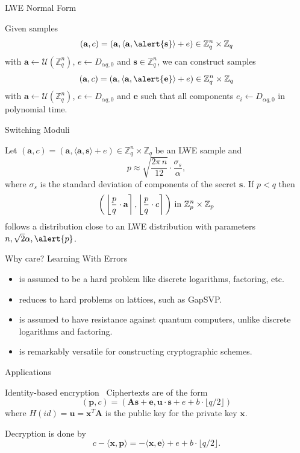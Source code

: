 \documentclass[10pt,compress]{beamer}
\renewcommand{\vec}[1]{\mathbf{#1}\xspace}
\newcommand{\A}{\vec{A}}
\newcommand{\s}{\vec{s}}
\newcommand{\ip}[2]{\langle #1, #2 \rangle}
\newcommand{\pq}{\ensuremath{\frac{p}{q}}}
\renewcommand{\vec}[1]{\mathbf{#1}\xspace}
\newcommand{\Z}{\ensuremath{\mathbb{Z}}\xspace}
\newcommand{\round}[1]{\ensuremath{\left\lfloor{#1}\right\rceil}\xspace}
\begin{document}
\begin{frame}{LWE Normal Form}
  \begin{alertblock}{}
    Given samples \[(\vec{a},c)=(\vec{a},\langle\vec{a},\alert{\vec{s}}\rangle+ e) \in \Z_q^n \times \Z_q\] with $\vec{a} \gets \mathcal{U}(\Z_q^n)$, $e \gets D_{\alpha q,0}$ and $\vec{s} \in \Z_q^n$, we can construct samples \[(\vec{a}, c)=(\vec{a},\langle\vec{a},\alert{\vec{e}}\rangle+ e) \in \Z_q^n \times \Z_q\] 
    with $\vec{a} \gets \mathcal{U}(\Z_q^n)$, $e \gets D_{\alpha q, 0}$ and \alert{$\vec{e}$} such that all components \alert{$e_i \gets D_{\alpha q, 0}$} in polynomial time.
  \end{alertblock}
\end{frame}

\begin{frame}{Switching Moduli}
  \begin{alertblock}{}
    Let $(\vec{a},c) =(\vec{a}, \langle \vec{a}, \vec{s} \rangle + e) \in \Z_q^n \times \Z_q$ be an LWE sample and \[p \approx \sqrt{\frac{2\pi\, n}{12}} \cdot \frac{\sigma_s}{\alpha},\] where $\sigma_s$ is the standard deviation of components of the secret $\vec{s}$. If $p<q$ then $$\bigg(\round{\pq \cdot \vec{a}}, \round{\pq \cdot  c}\bigg) \textnormal{ in } \Z_p^n \times \Z_p$$ follows a distribution  close to an LWE distribution with parameters $n, \sqrt{2}\alpha, \alert{p}$.
  \end{alertblock}
\end{frame}


\begin{frame}{Why care?}
  Learning With Errors
  \begin{itemize}
  \item is assumed to be a hard problem like discrete logarithms, factoring, etc.
  \item reduces to hard problems on lattices, such as GapSVP.
  \item is assumed to have resistance against quantum computers, unlike discrete logarithms and factoring.
  \item is remarkably versatile for constructing cryptographic schemes.
  \end{itemize}

\end{frame}

\begin{frame}{Applications}
  \begin{alertblock}{Identity-based encryption~\cite{STOC:GenPeiVai08}}
    Ciphertexts are of the form
    $$ (\vec{p}, c) = (\A \vec{s} + \vec{e}, \vec{u} \cdot \s + e + b\cdot \lfloor q/2 \rfloor)  $$
    where $H(id) = \vec{u} = \vec{x}^T\A$ is the public key for the private key $\vec{x}$.

    Decryption is done by
    $$ c - \ip{\vec{x}}{\vec{p}} = -\ip{\vec{x}}{\vec{e}} + e + b \cdot \lfloor q/2 \rfloor. $$
  \end{alertblock}
\end{frame}
\end{document}
